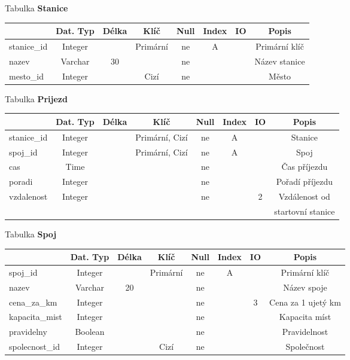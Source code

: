\documentclass[11pt]{article}
\begin{document}
\noindent
Tabulka \textbf{Stanice}

\begin{table}[H]
    \begin{tabular}{|l|c|c|c|c|c|c|c|} \hline
                & Dat. Typ  & Délka & Klíč      & Null  & Index & IO    & Popis \\ \hline
    stanice\_id	& Integer	&       & Primární	& ne	& A		&       & Primární klíč \\ \hline
    nazev	    & Varchar	& 30	&           & ne	&		&       & Název stanice \\ \hline
    mesto\_id	& Integer	&       & Cizí	    & ne	&		&       & Město \\ \hline
    \end{tabular}
\end{table}

\noindent
Tabulka \textbf{Prijezd}

\begin{table}[H]
    \begin{tabular}{|l|c|c|c|c|c|c|c|} \hline
                & Dat. Typ  & Délka & Klíč              & Null  & Index & IO    & Popis \\ \hline
    stanice\_id	& Integer	&	    & Primární, Cizí	& ne	& A     &		& Stanice \\ \hline
    spoj\_id	& Integer	&	    & Primární, Cizí	& ne	& A	    &	    & Spoj \\ \hline
    cas	        & Time		&	    &                   & ne	&		&       & Čas příjezdu \\ \hline
    poradi	    & Integer	&		&                   & ne	&		&       & Pořadí příjezdu \\ \hline
    vzdalenost	& Integer	&		&                   & ne	&	    & 2     & Vzdálenost od\\ &&&&&&& startovní stanice \\ \hline
    \end{tabular}
\end{table}

\newpage

\noindent
Tabulka \textbf{Spoj}

\begin{table}[H]
    \begin{tabular}{|l|c|c|c|c|c|c|c|} \hline
                    & Dat. Typ  & Délka & Klíč      & Null  & Index & IO    & Popis \\ \hline
    spoj\_id	    & Integer   &		& Primární  & ne	& A		&       & Primární klíč \\ \hline
    nazev	        & Varchar	& 20	&	        & ne	&		&       & Název spoje \\ \hline
    cena\_za\_km	& Integer	&	    &	        & ne	&	    & 3     & Cena za 1 ujetý km \\ \hline
    kapacita\_mist	& Integer	&	    &	        & ne	&		&       & Kapacita míst \\ \hline
    pravidelny	    & Boolean	&		&           & ne	&		&       & Pravidelnost \\ \hline
    spolecnost\_id	& Integer	&	    & Cizí	    & ne	&		&       & Společnost \\ \hline
    \end{tabular}
\end{table}
\end{document}
